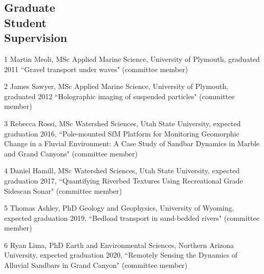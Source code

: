 \documentclass[margin,line]{resume}
\begin{document}
\begin{resume}
    \section{\mysidestyle Graduate \\ Student \\ Supervision}
        \begin{footnotesize}
	\begin{list1}
        \item[1] Martin Meoli, MSc Applied Marine Science, University of Plymouth, graduated 2011 ``Gravel transport under waves" (committee member)\\
        \item[2] James Sawyer, MSc Applied Marine Science, University of Plymouth, graduated 2012 ``Holographic imaging of suspended particles" (committee member) \\  
        \item[3] Rebecca Rossi, MSc Watershed Sciences, Utah State University, expected graduation 2016, ``Pole-mounted SfM Platform for Monitoring Geomorphic Change in a Fluvial Environment: A Case Study of Sandbar Dynamics in Marble and Grand Canyons" (committee member)\\
        \item[4] Daniel Hamill, MSc Watershed Sciences, Utah State University, expected graduation 2017, ``Quantifying Riverbed Textures Using Recreational Grade Sidescan Sonar" (committee member)\\
        \item[5] Thomas Ashley, PhD Geology and Geophysics, University of Wyoming, expected graduation 2019, ``Bedload transport in sand-bedded rivers" (committee member)        \\
        \item[6] Ryan Lima, PhD Earth and Environmental Sciences, Northern Arizona University, expected graduation 2020, ``Remotely Sensing the Dynamics of Alluvial Sandbars in Grand Canyon" (committee member)         

       	\end{list1} 
        \end{footnotesize}          	


\end{resume}
\end{document}
